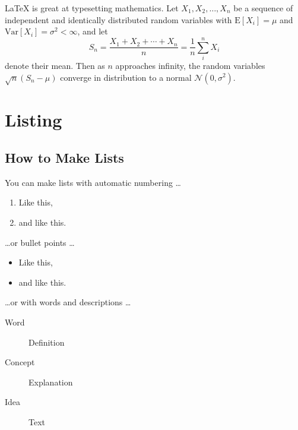 \documentclass[a4paper]{article}
\begin{document}
\LaTeX{} is great at typesetting mathematics. Let $X_1, X_2, \ldots, X_n$ be a sequence of independent and identically distributed random variables with $\text{E}[X_i] = \mu$ and $\text{Var}[X_i] = \sigma^2 < \infty$, and let
$$S_n = \frac{X_1 + X_2 + \cdots + X_n}{n}
      = \frac{1}{n}\sum_{i}^{n} X_i$$
denote their mean. Then as $n$ approaches infinity, the random variables $\sqrt{n}(S_n - \mu)$ converge in distribution to a normal $\mathcal{N}(0, \sigma^2)$.


\section{Listing}
\subsection{How to Make Lists}

You can make lists with automatic numbering \dots

\begin{enumerate}
    \item Like this,
    \item and like this.
\end{enumerate}
\dots or bullet points \dots
\begin{itemize}
    \item Like this,
    \item and like this.
\end{itemize}
\dots or with words and descriptions \dots
\begin{description}
    \item[Word] Definition
    \item[Concept] Explanation
    \item[Idea] Text
\end{description}
\end{document}
